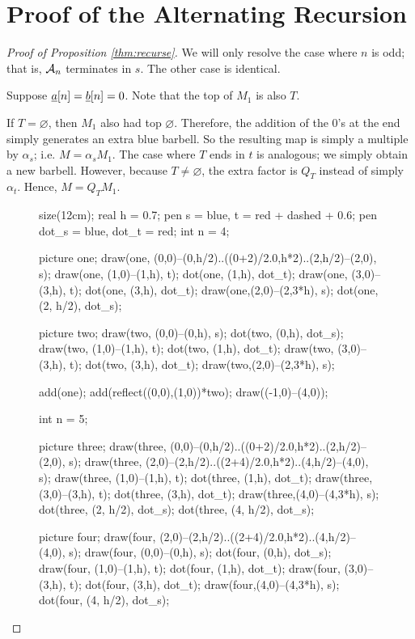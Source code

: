 \section{Proof of the Alternating Recursion}
\label{sec:recurse_proof}
\begin{proof}[Proof of Proposition \ref{thm:recurse}]
	We will only resolve the case where $n$ is odd; that is, $\AA_n$ terminates in $s$.  The other case is identical.
	\begin{enumerate}[(i)]
		\ii Suppose $\ul a[n] = \ul b[n] = 0$.  Note that the top of $M_1$ is also $T$.
		\begin{itemize}
			\ii If $T = \varnothing$, then $M_1$ also had top $\varnothing$.  Therefore, the addition of the $0$'s at the end simply generates an extra blue barbell.  So the resulting map is simply a multiple by $\alpha_s$; i.e. $M = \alpha_sM_1$.
			\ii The case where $T$ ends in $t$ is analogous; we simply obtain a new barbell.  However, because $T \neq \varnothing$, the extra factor is $Q_T$ instead of simply $\alpha_t$.  Hence, $M = Q_TM_1$.
			\begin{figure}[ht]
				\centering
				\begin{asy}
					size(12cm);
					real h = 0.7;
					pen s = blue, t = red + dashed + 0.6;
					pen dot_s = blue, dot_t = red;
					int n = 4;

					picture one;
					draw(one, (0,0)--(0,h/2)..((0+2)/2.0,h*2)..(2,h/2)--(2,0), s);
					draw(one, (1,0)--(1,h), t);
					dot(one, (1,h), dot_t);
					draw(one, (3,0)--(3,h), t);
					dot(one, (3,h), dot_t);
					draw(one,(2,0)--(2,3*h), s);
					dot(one, (2, h/2), dot_s);

					picture two;
					draw(two, (0,0)--(0,h), s);
					dot(two, (0,h), dot_s);
					draw(two, (1,0)--(1,h), t);
					dot(two, (1,h), dot_t);
					draw(two, (3,0)--(3,h), t);
					dot(two, (3,h), dot_t);
					draw(two,(2,0)--(2,3*h), s);

					add(one); add(reflect((0,0),(1,0))*two);
					draw((-1,0)--(4,0));

					int n = 5;

					picture three;
					draw(three, (0,0)--(0,h/2)..((0+2)/2.0,h*2)..(2,h/2)--(2,0), s);
					draw(three, (2,0)--(2,h/2)..((2+4)/2.0,h*2)..(4,h/2)--(4,0), s);
					draw(three, (1,0)--(1,h), t);
					dot(three, (1,h), dot_t);
					draw(three, (3,0)--(3,h), t);
					dot(three, (3,h), dot_t);
					draw(three,(4,0)--(4,3*h), s);
					dot(three, (2, h/2), dot_s);
					dot(three, (4, h/2), dot_s);

					picture four;
					draw(four, (2,0)--(2,h/2)..((2+4)/2.0,h*2)..(4,h/2)--(4,0), s);
					draw(four, (0,0)--(0,h), s);
					dot(four, (0,h), dot_s);
					draw(four, (1,0)--(1,h), t);
					dot(four, (1,h), dot_t);
					draw(four, (3,0)--(3,h), t);
					dot(four, (3,h), dot_t);
					draw(four,(4,0)--(4,3*h), s);
					dot(four, (4, h/2), dot_s);


\end{asy}
\end{figure}
\end{itemize}
\end{enumerate}
\end{proof}
